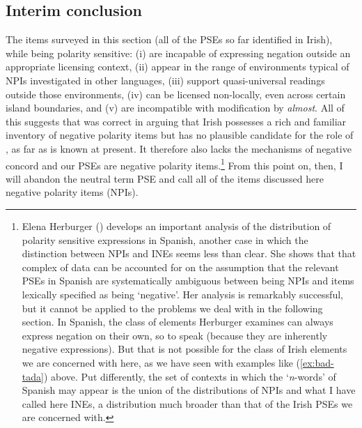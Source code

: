 \documentclass[output=paper,colorlinks,citecolor=brown]{langscibook}
\begin{document}
\subsection{Interim conclusion}
\label{sec:sum}

The items surveyed in this section (all of the PSEs so far identified in Irish),  while being polarity sensitive: (i) are incapable of expressing negation outside an appropriate licensing context, (ii) appear in the range of environments typical of NPIs investigated in other languages, (iii) support quasi-universal readings outside those environments, (iv) can be licensed non-locally, even across certain island boundaries, and (v) are incompatible with modification by \textit{almost}.  All of this suggests that \citet{jm:acquaviva:96} was correct in arguing that Irish possesses a rich and familiar inventory of negative polarity items but has no plausible candidate for the role of , as far as is known at present. It therefore also lacks the mechanisms of negative concord and our PSEs are negative polarity items.\footnote{Elena Herburger (\citeyear{herburger:01}) develops an important analysis of the distribution of polarity sensitive expressions in Spanish, another case in which the distinction between NPIs and INEs seems less than clear. She shows that that complex of data can be accounted for on the assumption that the relevant PSEs in Spanish are systematically ambiguous between being NPIs and items lexically specified as being   `negative'. Her analysis is remarkably successful, but it cannot be applied to the problems we   deal with in the following section. In Spanish, the class of elements Herburger examines can always express negation on their own, so to speak (because they are inherently negative expressions).  But that is not possible for the class of Irish elements we are concerned with here, as we have seen with examples like (\ref{ex:bad-tada}) above. Put differently, the set of contexts in which the `{\itshape n}-words' of Spanish may appear is the union of the distributions of NPIs and what I have called here INEs, a distribution much broader than that of the Irish PSEs we are concerned with.} From this point on, then, I will abandon the neutral term PSE and call all of the items discussed here negative polarity items (NPIs).
\end{document}
